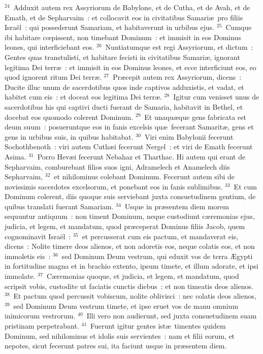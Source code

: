 ${}^{24}$~Adduxit autem rex Assyriorum de Babylone, et de Cutha, et de Avah, et de Emath, et de Sepharvaim~: et collocavit eos in civitatibus Samari\ae\ pro filiis Isra\"el~: qui possederunt Samariam, et habitaverunt in urbibus ejus.
${}^{25}$~Cumque ibi habitare cœpissent, non timebant Dominum~: et immisit in eos Dominus leones, qui interficiebant eos.
${}^{26}$~Nuntiatumque est regi Assyriorum, et dictum~: Gentes quas transtulisti, et habitare fecisti in civitatibus Samari\ae , ignorant legitima Dei terr\ae~: et immisit in eos Dominus leones, et ecce interficiunt eos, eo quod ignorent ritum Dei terr\ae .
${}^{27}$~Pr\ae cepit autem rex Assyriorum, dicens~: Ducite illuc unum de sacerdotibus quos inde captivos adduxistis, et vadat, et habitet cum eis~: et doceat eos legitima Dei terr\ae .
${}^{28}$~Igitur cum venisset unus de sacerdotibus his qui captivi ducti fuerant de Samaria, habitavit in Bethel, et docebat eos quomodo colerent Dominum.
${}^{29}$~Et unaqu\ae que gens fabricata est deum suum~: posueruntque eos in fanis excelsis qu\ae\ fecerant Samarit\ae , gens et gens in urbibus suis, in quibus habitabat.
${}^{30}$~Viri enim Babylonii fecerunt Sochothbenoth~: viri autem Cuth\ae i fecerunt Nergel~: et viri de Emath fecerunt Asima.
${}^{31}$~Porro Hev\ae i fecerunt Nebahaz et Tharthac. Hi autem qui erant de Sepharvaim, comburebant filios suos igni, Adramelech et Anamelech diis Sepharvaim,
${}^{32}$~et nihilominus colebant Dominum. Fecerunt autem sibi de novissimis sacerdotes excelsorum, et ponebant eos in fanis sublimibus.
${}^{33}$~Et cum Dominum colerent, diis quoque suis serviebant juxta consuetudinem gentium, de quibus translati fuerant Samariam.
${}^{34}$~Usque in pr\ae sentem diem morem sequuntur antiquum~: non timent Dominum, neque custodiunt c\ae remonias ejus, judicia, et legem, et mandatum, quod pr\ae ceperat Dominus filiis Jacob, quem cognominavit Isra\"el~:
${}^{35}$~et percusserat cum eis pactum, et mandaverat eis, dicens~: Nolite timere deos alienos, et non adoretis eos, neque colatis eos, et non immoletis eis~:
${}^{36}$~sed Dominum Deum vestrum, qui eduxit vos de terra \AE gypti in fortitudine magna et in brachio extento, ipsum timete, et illum adorate, et ipsi immolate.
${}^{37}$~C\ae remonias quoque, et judicia, et legem, et mandatum, quod scripsit vobis, custodite ut faciatis cunctis diebus~: et non timeatis deos alienos.
${}^{38}$~Et pactum quod percussit vobiscum, nolite oblivisci~: nec colatis deos alienos,
${}^{39}$~sed Dominum Deum vestrum timete, et ipse eruet vos de manu omnium inimicorum vestrorum.
${}^{40}$~Illi vero non audierunt, sed juxta consuetudinem suam pristinam perpetrabant.
${}^{41}$~Fuerunt igitur gentes ist\ae\ timentes quidem Dominum, sed nihilominus et idolis suis servientes~: nam et filii eorum, et nepotes, sicut fecerunt patres sui, ita faciunt usque in pr\ae sentem diem.

